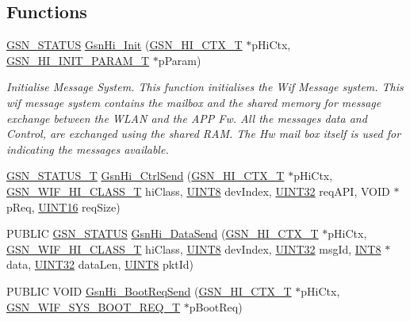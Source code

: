\subsection*{Functions}
\begin{DoxyCompactItemize}
\item 
\hyperlink{a00660_gada5951904ac6110b1fa95e51a9ddc217}{GSN\_\-STATUS} \hyperlink{a00623_ga9d165724225b153f84dcf1184ebcf044}{GsnHi\_\-Init} (\hyperlink{a00085}{GSN\_\-HI\_\-CTX\_\-T} $\ast$pHiCtx, \hyperlink{a00088}{GSN\_\-HI\_\-INIT\_\-PARAM\_\-T} $\ast$pParam)
\begin{DoxyCompactList}\small\item\em Initialise Message System. This function initialises the Wif Message system. This wif message system contains the mailbox and the shared memory for message exchange between the WLAN and the APP Fw. All the messages data and Control, are exchanged using the shared RAM. The Hw mail box itself is used for indicating the messages available. \end{DoxyCompactList}\item 
\hyperlink{a00659_gae36517c0f5872426a7034c9551eb96ac}{GSN\_\-STATUS\_\-T} \hyperlink{a00504_a1a12a1d12a90b2c1a1364f14488c6746}{GsnHi\_\-CtrlSend} (\hyperlink{a00085}{GSN\_\-HI\_\-CTX\_\-T} $\ast$pHiCtx, \hyperlink{a00608_a6fed68726c005805e6c3841b055b1b8b}{GSN\_\-WIF\_\-HI\_\-CLASS\_\-T} hiClass, \hyperlink{a00660_gab27e9918b538ce9d8ca692479b375b6a}{UINT8} devIndex, \hyperlink{a00660_gae1e6edbbc26d6fbc71a90190d0266018}{UINT32} reqAPI, VOID $\ast$pReq, \hyperlink{a00660_ga09f1a1fb2293e33483cc8d44aefb1eb1}{UINT16} reqSize)
\item 
PUBLIC \hyperlink{a00660_gada5951904ac6110b1fa95e51a9ddc217}{GSN\_\-STATUS} \hyperlink{a00504_abd4555713b0cfa991359c10ec74bf0b3}{GsnHi\_\-DataSend} (\hyperlink{a00085}{GSN\_\-HI\_\-CTX\_\-T} $\ast$pHiCtx, \hyperlink{a00608_a6fed68726c005805e6c3841b055b1b8b}{GSN\_\-WIF\_\-HI\_\-CLASS\_\-T} hiClass, \hyperlink{a00660_gab27e9918b538ce9d8ca692479b375b6a}{UINT8} devIndex, \hyperlink{a00660_gae1e6edbbc26d6fbc71a90190d0266018}{UINT32} msgId, \hyperlink{a00660_ga307b8734c020247f6bac4fcde0dcfbb9}{INT8} $\ast$data, \hyperlink{a00660_gae1e6edbbc26d6fbc71a90190d0266018}{UINT32} dataLen, \hyperlink{a00660_gab27e9918b538ce9d8ca692479b375b6a}{UINT8} pktId)
\item 
PUBLIC VOID \hyperlink{a00504_afe301e46d683e5d7e8106318e70fe648}{GsnHi\_\-BootReqSend} (\hyperlink{a00085}{GSN\_\-HI\_\-CTX\_\-T} $\ast$pHiCtx, \hyperlink{a00348}{GSN\_\-WIF\_\-SYS\_\-BOOT\_\-REQ\_\-T} $\ast$pBootReq)

\end{DoxyCompactItemize}
